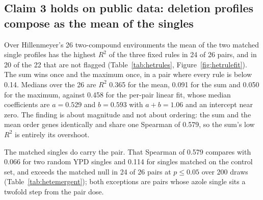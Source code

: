 
\subsection{Claim 3 holds on public data: deletion profiles compose as the mean of the
singles}
\label{sec:claim3}

Over Hillenmeyer's 26 two-compound environments the mean of the two matched single
profiles has the highest $R^2$ of the three fixed rules in 24 of 26 pairs, and in 20 of
the 22 that are not flagged (Table~\ref{tab:hetrules}, Figure~\ref{fig:hetrulefit}). The
sum wins once and the maximum once, in a pair where every rule is below 0.14. Medians over
the 26 are $R^2$ 0.365 for the mean, 0.091 for the sum and 0.050 for the maximum, against
0.458 for the per-pair linear fit, whose median coefficients are $a = 0.529$ and
$b = 0.593$ with $a + b = 1.06$ and an intercept near zero. The finding is about magnitude
and not about ordering: the sum and the mean order genes identically and share one
Spearman of 0.579, so the sum's low $R^2$ is entirely its overshoot.

The matched singles do carry the pair. That Spearman of 0.579 compares with 0.066 for two
random YPD singles and 0.114 for singles matched on the control set, and exceeds the
matched null in 24 of 26 pairs at $p \le 0.05$ over 200 draws
(Table~\ref{tab:hetemergent}); both exceptions are pairs whose azole single sits a
twofold step from the pair dose.

\begin{table}[htbp]
\centering
\footnotesize
\caption[]{How a two-compound profile relates to its two single profiles, over
Hillenmeyer's 26 two-compound environments and the 22 that are not flagged. $R^2$ is of
the rule as it stands, with no refit, so a rule of the wrong magnitude scores low or
negative; Spearman is scale-free, which is why the sum and the mean share one value. The
sum is the Bliss product on this scale (Equation~\ref{eq:blisslog}). Best value per
column in bold. The free linear fit is fitted per pair and so is an upper reference, not a
rule that could be applied to an unmeasured pair.}
\label{tab:hetrules}

\end{table}

